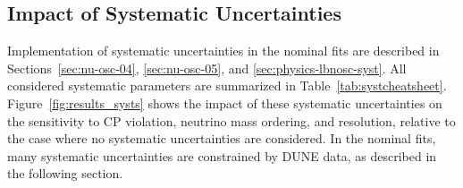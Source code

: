 \subsection{Impact of Systematic Uncertainties}
\label{sec:physics-lbnosc-systresults}

Implementation of systematic uncertainties in the nominal fits are described in Sections~\ref{sec:nu-osc-04}, \ref{sec:nu-osc-05}, and \ref{sec:physics-lbnosc-syst}. All considered systematic parameters are summarized in Table~\ref{tab:systcheatsheet}. Figure~\ref{fig:results_systs} shows the impact of these systematic uncertainties on the sensitivity to CP violation, neutrino mass ordering, and \deltacp resolution, relative to the case where no systematic uncertainties are considered. In the nominal fits, many systematic uncertainties are constrained by DUNE data, as described in the following section.

